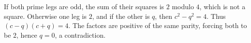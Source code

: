 If both prime legs are odd, the sum of their squares is $2$ modulo $4$, which is not a square. Otherwise one leg is $2$, and if the other is $q$, then $c^2-q^2=4$. Thus $(c-q)(c+q)=4$. The factors are positive of the same parity, forcing both to be $2$, hence $q=0$, a contradiction.
